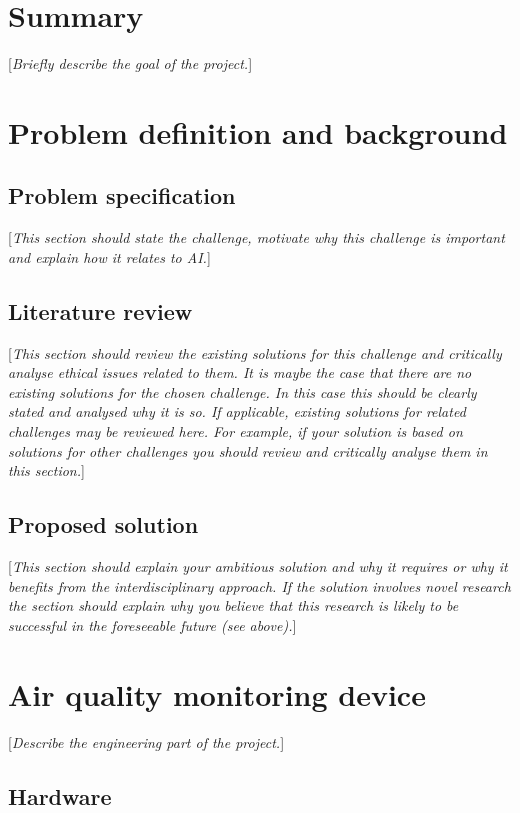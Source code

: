 \documentclass[10pt,english, openany]{book}
\begin{document}
\chapter{Summary}\label{chapt:sum}
[\textit{Briefly describe the goal of the project.}]

\chapter{Problem definition and background}
\section{Problem specification}
[\textit{This section should state the challenge, motivate why this challenge is important and explain how it relates to AI.}]

\section{Literature review}
[\textit{This section should review the existing solutions for this challenge and critically analyse ethical issues related to them. It is maybe the case that there are no existing solutions for the chosen challenge. In this case this should be clearly stated and analysed why it is so. If applicable, existing solutions for related challenges may be reviewed here. For example, if your solution is based on solutions for other challenges you should review and critically analyse them in this section.}]

\section{Proposed solution}
[\textit{This section should explain your ambitious solution and why it requires or why it benefits from the interdisciplinary approach. If the solution involves novel research the section should explain why you believe that this research is likely to be successful in the foreseeable future (see above).}]

\chapter{Air quality monitoring device}\label{chapt:doe}
[\textit{Describe the engineering part of the project.}]

\section{Hardware}
\end{document}
